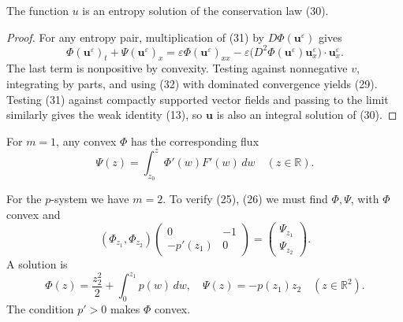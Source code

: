 \begin{theorem}
\label{thm:entropy-vanishing-viscosity}
The function $u$ is an entropy solution of the conservation law (30).
\end{theorem}

\begin{proof}
\sketch For any entropy pair, multiplication of (31) by $D\Phi(\mathbf u^\varepsilon)$ gives
\[
\Phi(\mathbf u^\varepsilon)_t+\Psi(\mathbf u^\varepsilon)_x
=\varepsilon\Phi(\mathbf u^\varepsilon)_{xx}
-\varepsilon\bigl(D^2\Phi(\mathbf u^\varepsilon)\mathbf u_x^\varepsilon\bigr)\cdot\mathbf u_x^\varepsilon.
\]
The last term is nonpositive by convexity. Testing against nonnegative $v$, integrating by parts, and using (32) with dominated convergence yields (29). Testing (31) against compactly supported vector fields and passing to the limit similarly gives the weak identity (13), so $\mathbf u$ is also an integral solution of (30).
\end{proof}

\begin{example}
\label{ex:scalar-entropy-flux-existence}
For $m=1$, any convex $\Phi$ has the corresponding flux
$$\Psi(z) = \int_{z_0}^z \Phi'(w)F'(w)\,dw \quad (z\in\mathbb{R}).$$
\end{example}

\begin{example}
\label{ex:p-system-entropy-pair}
For the $p$-system we have $m=2$. To verify (25), (26) we must find $\Phi,\Psi$, with $\Phi$ convex and
$$(\Phi_{z_1},\Phi_{z_2})\begin{pmatrix} 0 & -1 \\ -p'(z_1) & 0 \end{pmatrix} = \begin{pmatrix} \Psi_{z_1} \\ \Psi_{z_2} \end{pmatrix}.$$
A solution is
$$\Phi(z) = \frac{z_2^2}{2} + \int_0^{z_1} p(w)\,dw, \quad \Psi(z) = -p(z_1)z_2 \quad (z\in\mathbb{R}^2).$$
The condition $p'>0$ makes $\Phi$ convex.
\end{example}

